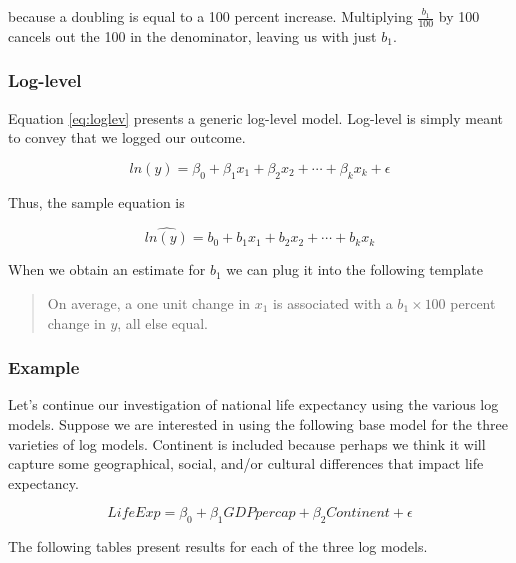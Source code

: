 \documentclass[
]{book}
\begin{document}
because a doubling is equal to a 100 percent increase. Multiplying \(\frac{b_1}{100}\) by 100 cancels out the 100 in the denominator, leaving us with just \(b_1\).

\hypertarget{log-level}{%
\subsubsection*{Log-level}\label{log-level}}

Equation \eqref{eq:loglev} presents a generic log-level model. Log-level is simply meant to convey that we logged our outcome.

\begin{equation}
ln(y)=\beta_0 + \beta_1x_1 + \beta_2x_2 + \cdots + \beta_kx_k + \epsilon
\label{eq:loglev}
\end{equation}

Thus, the sample equation is

\begin{equation}
\hat{ln(y)}=b_0 + b_1x_1 + b_2x_2 + \cdots + b_kx_k
\label{eq:loglevsamp}
\end{equation}

When we obtain an estimate for \(b_1\) we can plug it into the following template

\begin{quote}
On average, a one unit change in \(x_1\) is associated with a \(b_1 \times 100\) percent change in \(y\), all else equal.
\end{quote}

\hypertarget{example}{%
\subsubsection*{Example}\label{example}}

Let's continue our investigation of national life expectancy using the various log models. Suppose we are interested in using the following base model for the three varieties of log models. Continent is included because perhaps we think it will capture some geographical, social, and/or cultural differences that impact life expectancy.

\begin{equation}
LifeExp=\beta_0 + \beta_1GDPpercap + \beta_2Continent + \epsilon
\label{eq:logex}
\end{equation}

The following tables present results for each of the three log models.
\end{document}
